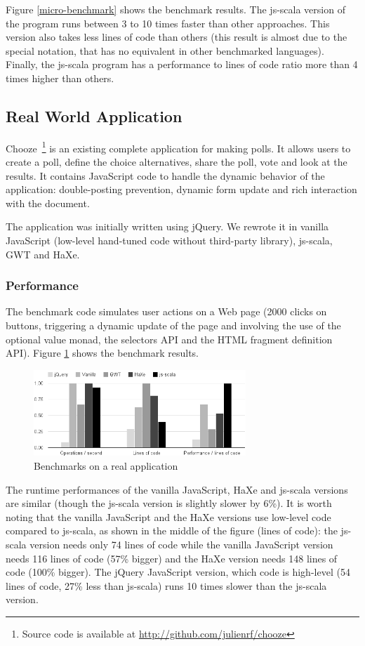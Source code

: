 \documentclass[preprint]{sigplanconf}
\begin{document}
Figure \ref{micro-benchmark} shows the benchmark results. The js-scala version of the program runs
between 3 to 10 times faster than other approaches. This version also takes less lines of code than
others (this result is almost due to the special  notation, that has no equivalent in
other benchmarked languages). Finally, the js-scala program has a performance to lines of code ratio
more than 4 times higher than others.

\subsection{Real World Application}

Chooze~\footnote{Source code is available at
\href{http://github.com/julienrf/chooze}{http://github.com/julienrf/chooze}} is an existing
complete application for making polls. It allows users to create a poll, define the choice
alternatives, share the poll, vote and look at the results. It contains JavaScript code to handle
the dynamic behavior of the application: double-posting prevention, dynamic form update and rich
interaction with the document.

The application was initially written using jQuery. We rewrote it in vanilla JavaScript (low-level
hand-tuned code without third-party library), js-scala, GWT and HaXe.

\subsubsection{Performance}

The benchmark code simulates user actions on a Web page (2000 clicks on buttons, triggering a
dynamic update of the page and involving the use of the optional value monad, the selectors API and
the HTML fragment definition API). Figure \ref{benchmark} shows the benchmark results.

\begin{figure}
\centering
\includegraphics[width=8cm]{chooze.png}
\caption{Benchmarks on a real application}
\label{benchmark}
\end{figure}

The runtime performances of the vanilla JavaScript, HaXe and js-scala versions are similar (though
the js-scala version is slightly slower by 6\%). It is worth noting that the vanilla JavaScript and
the HaXe versions use low-level code compared to js-scala, as shown in the middle of the figure
(lines of code): the js-scala version needs only 74 lines of code while the vanilla JavaScript
version needs 116 lines of code (57\% bigger) and the HaXe version needs 148 lines of code (100\%
bigger). The jQuery JavaScript version, which code is high-level (54 lines of code, 27\% less
than js-scala) runs 10 times slower than the js-scala version.
\end{document}

